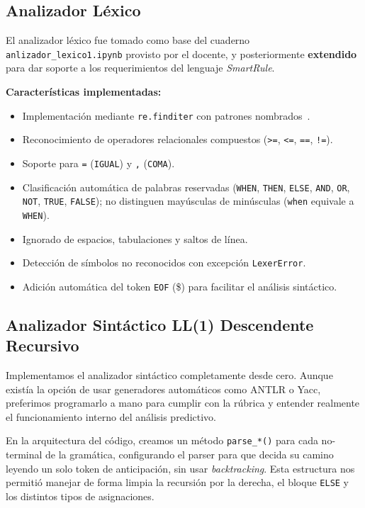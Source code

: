 \documentclass[12pt,a4paper]{article}
\begin{document}
\subsection{Analizador Léxico}
El analizador léxico fue tomado como base del cuaderno \texttt{anlizador\_lexico1.ipynb} provisto por el docente, y posteriormente \textbf{extendido} para dar soporte a los requerimientos del lenguaje \textit{SmartRule}.

\textbf{Características implementadas:}
\begin{itemize}[leftmargin=1cm]
    \item Implementación mediante \texttt{re.finditer} con patrones nombrados~\cite[sección \textit{Writing a Tokenizer}]{pythonre}.
   
    \item Reconocimiento de operadores relacionales compuestos (\texttt{>=}, \texttt{<=}, \texttt{==}, \texttt{!=}).
    \item Soporte para \texttt{=} (\texttt{IGUAL}) y \texttt{,} (\texttt{COMA}).
    \item Clasificación automática de palabras reservadas (\texttt{WHEN}, \texttt{THEN}, \texttt{ELSE}, \texttt{AND}, \texttt{OR}, \texttt{NOT}, \texttt{TRUE}, \texttt{FALSE}); no distinguen mayúsculas de minúsculas (\texttt{when} equivale a \texttt{WHEN}).
    \item Ignorado de espacios, tabulaciones y saltos de línea.
    \item Detección de símbolos no reconocidos con excepción \texttt{LexerError}.
    \item Adición automática del token \texttt{EOF} (\$) para facilitar el análisis sintáctico.
\end{itemize}


\newpage

\subsection{Analizador Sintáctico LL(1) Descendente Recursivo}
Implementamos el analizador sintáctico completamente desde cero. Aunque existía la opción de usar generadores automáticos como ANTLR o Yacc, preferimos programarlo a mano para cumplir con la rúbrica y entender realmente el funcionamiento interno del análisis predictivo. 

En la arquitectura del código, creamos un método \texttt{parse\_*()} para cada no-terminal de la gramática, configurando el parser para que decida su camino leyendo un solo token de anticipación, sin usar \textit{backtracking}. Esta estructura nos permitió manejar de forma limpia la recursión por la derecha, el bloque \texttt{ELSE} y los distintos tipos de asignaciones.
\end{document}
